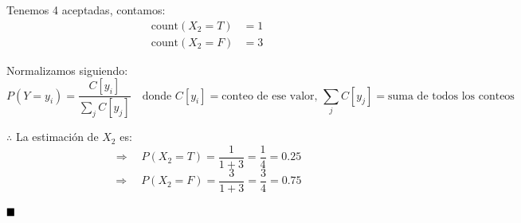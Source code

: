 \noindent Tenemos 4 aceptadas, contamos:
\[
  \begin{aligned}
    \text{count}(X_2 = T) &= 1\\
    \text{count}(X_2 = F) &= 3
  \end{aligned}
\]

\noindent Normalizamos siguiendo:
\[
  P(Y = y_i) = \frac{C[y_i]}{\displaystyle\sum_j C[y_j]}
  \quad
  \text{donde } C[y_i] = \text{conteo de ese valor, } \textstyle\sum_j C[y_j] = \text{suma de todos los conteos}
\]

$\therefore$ La estimación de $X_2$ es:
\[
  \Rightarrow\quad
  P(X_2 = T) = \frac{1}{1+3} = \frac{1}{4} = 0.25
\]
\[
  \Rightarrow\quad
  P(X_2 = F) = \frac{3}{1+3} = \frac{3}{4} = 0.75
\]

$\hfill \blacksquare$
